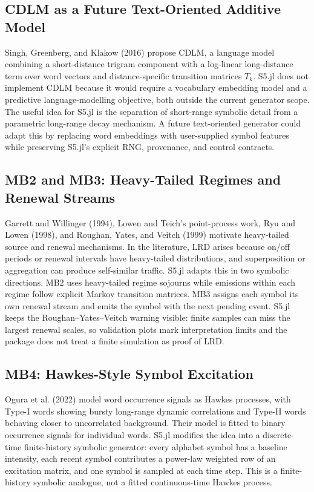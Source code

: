 \documentclass[11pt]{article}
\begin{document}
\subsection{CDLM as a Future Text-Oriented Additive Model}

Singh, Greenberg, and Klakow (2016) propose CDLM, a language model combining a
short-distance trigram component with a log-linear long-distance term over word
vectors and distance-specific transition matrices $T_k$. S5.jl does not
implement CDLM because it would require a vocabulary embedding model and a
predictive language-modelling objective, both outside the current generator
scope. The useful idea for S5.jl is the separation of short-range symbolic
detail from a parametric long-range decay mechanism. A future text-oriented
generator could adapt this by replacing word embeddings with user-supplied
symbol features while preserving S5.jl's explicit RNG, provenance, and control
contracts.

\subsection{MB2 and MB3: Heavy-Tailed Regimes and Renewal Streams}

Garrett and Willinger (1994), Lowen and Teich's point-process work, Ryu and
Lowen (1998), and Roughan, Yates, and Veitch (1999) motivate heavy-tailed
source and renewal mechanisms. In the literature, LRD arises because on/off
periods or renewal intervals have heavy-tailed distributions, and superposition
or aggregation can produce self-similar traffic. S5.jl adapts this in two
symbolic directions. MB2 uses heavy-tailed regime sojourns while emissions
within each regime follow explicit Markov transition matrices. MB3 assigns
each symbol its own renewal stream and emits the symbol with the next pending
event. S5.jl keeps the Roughan--Yates--Veitch warning visible: finite samples
can miss the largest renewal scales, so validation plots mark interpretation
limits and the package does not treat a finite simulation as proof of LRD.

\subsection{MB4: Hawkes-Style Symbol Excitation}

Ogura et al. (2022) model word occurrence signals as Hawkes processes, with
Type-I words showing bursty long-range dynamic correlations and Type-II words
behaving closer to uncorrelated background. Their model is fitted to binary
occurrence signals for individual words. S5.jl modifies the idea into a
discrete-time finite-history symbolic generator: every alphabet symbol has a
baseline intensity, each recent symbol contributes a power-law weighted row of
an excitation matrix, and one symbol is sampled at each time step. This is a
finite-history symbolic analogue, not a fitted continuous-time Hawkes process.
\end{document}
